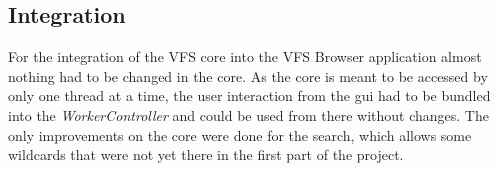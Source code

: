 \subsection{Integration}

For the integration of the VFS core into the VFS Browser application almost
nothing had to be changed in the core. As the core is meant to be accessed by
only one thread at a time, the user interaction from the gui had to be bundled
into the \textit{WorkerController} and could be used from there without changes.
The only improvements on the core were done for the search, which allows some
wildcards that were not yet there in the first part of the project.
